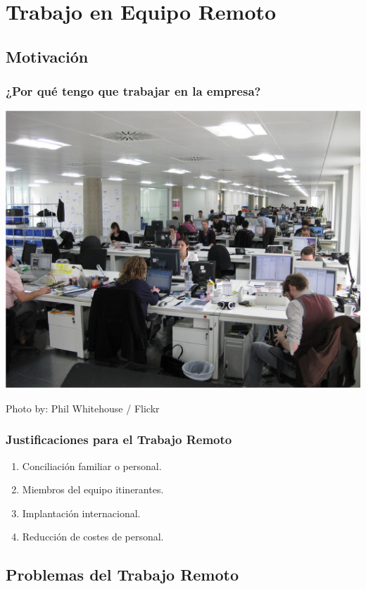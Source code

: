 \documentclass[handout,a4paper,t,xcolor=pst,dvips]{beamer}
\begin{document}
\section{Trabajo en Equipo Remoto}

\subsection{Motivación}

\begin{frame}[c]
	\frametitle{¿Por qué tengo que trabajar en la empresa?}
	\begin{center}
		\includegraphics[width=0.75\linewidth,keepaspectratio=true]{images/motivacion01.eps}
	\end{center}
	\begin{flushright}
		\tiny{Photo by: Phil Whitehouse / Flickr}
	\end{flushright}
\end{frame}

\begin{frame}[c]
	\frametitle{Justificaciones para el Trabajo Remoto}
	\begin{enumerate}[<+->]
        \item Conciliación familiar o personal.
        \item Miembros del equipo itinerantes.
        \item Implantación internacional.
        \item Reducción de costes de personal.
	\end{enumerate}
\end{frame}

\subsection{Problemas del Trabajo Remoto}
\end{document}
